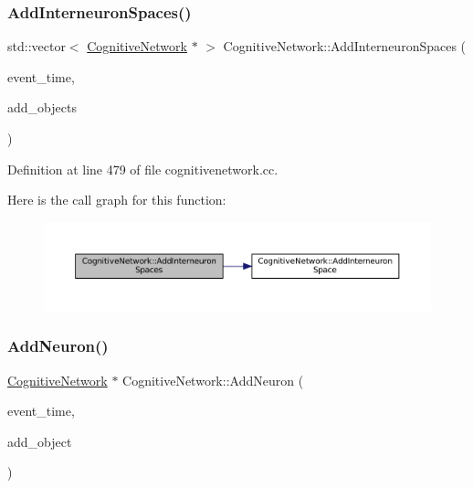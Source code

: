 \subsubsection{\texorpdfstring{Add\+Interneuron\+Spaces()}{AddInterneuronSpaces()}}
{\footnotesize\ttfamily std\+::vector$<$ \mbox{\hyperlink{class_cognitive_network}{Cognitive\+Network}} $\ast$ $>$ Cognitive\+Network\+::\+Add\+Interneuron\+Spaces (\begin{DoxyParamCaption}\item[{std\+::chrono\+::time\+\_\+point$<$ \mbox{\hyperlink{universe_8h_a0ef8d951d1ca5ab3cfaf7ab4c7a6fd80}{Clock}} $>$}]{event\+\_\+time,  }\item[{std\+::vector$<$ \mbox{\hyperlink{class_cognitive_network}{Cognitive\+Network}} $\ast$$>$}]{add\+\_\+objects }\end{DoxyParamCaption})}



Definition at line 479 of file cognitivenetwork.\+cc.

Here is the call graph for this function\+:\nopagebreak
\begin{figure}[H]
\begin{center}
\leavevmode
\includegraphics[width=350pt]{class_cognitive_network_aeafe16b9f44ae1316c072a85e726ee83_cgraph}
\end{center}
\end{figure}
\mbox{\label{class_cognitive_network_a8457342637fde2d814c54942c3367416}} 
\subsubsection{\texorpdfstring{Add\+Neuron()}{AddNeuron()}}
{\footnotesize\ttfamily \mbox{\hyperlink{class_cognitive_network}{Cognitive\+Network}} $\ast$ Cognitive\+Network\+::\+Add\+Neuron (\begin{DoxyParamCaption}\item[{std\+::chrono\+::time\+\_\+point$<$ \mbox{\hyperlink{universe_8h_a0ef8d951d1ca5ab3cfaf7ab4c7a6fd80}{Clock}} $>$}]{event\+\_\+time,  }\item[{\mbox{\hyperlink{class_cognitive_network}{Cognitive\+Network}} $\ast$}]{add\+\_\+object }\end{DoxyParamCaption})}



